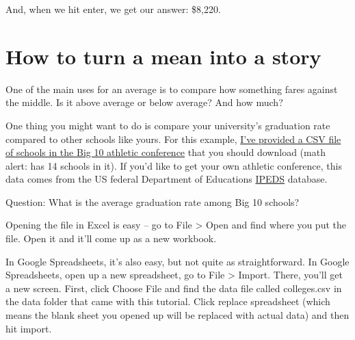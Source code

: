 \documentclass[
]{book}
\begin{document}
And, when we hit enter, we get our answer: \$8,220.

\hypertarget{how-to-turn-a-mean-into-a-story}{%
\section{How to turn a mean into a story}\label{how-to-turn-a-mean-into-a-story}}

One of the main uses for an average is to compare how something fares against the middle. Is it above average or below average? And how much?

One thing you might want to do is compare your university's graduation rate compared to other schools like yours. For this example, \href{http://mattwaite.github.io/mathanddatafiles/colleges.csv}{I've provided a CSV file of schools in the Big 10 athletic conference} that you should download (math alert: has 14 schools in it). If you'd like to get your own athletic conference, this data comes from the US federal Department of Educations \href{https://nces.ed.gov/ipeds/datacenter/Default.aspx}{IPEDS} database.

Question: What is the average graduation rate among Big 10 schools?

Opening the file in Excel is easy -- go to File \textgreater{} Open and find where you put the file. Open it and it'll come up as a new workbook.

In Google Spreadsheets, it's also easy, but not quite as straightforward. In Google Spreadsheets, open up a new spreadsheet, go to File \textgreater{} Import. There, you'll get a new screen. First, click Choose File and find the data file called colleges.csv in the data folder that came with this tutorial. Click replace spreadsheet (which means the blank sheet you opened up will be replaced with actual data) and then hit import.
\end{document}
